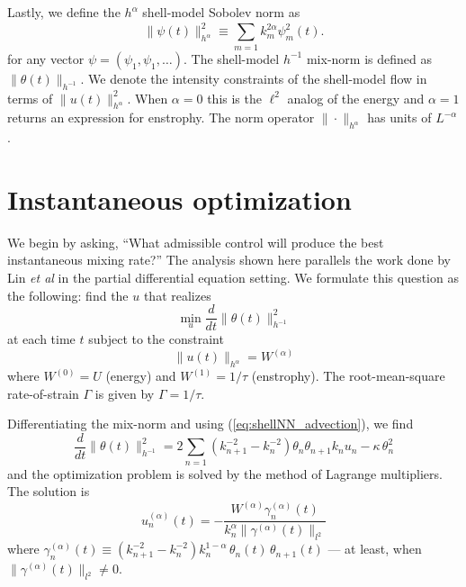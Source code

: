 Lastly, we define the $h^{\alpha}$ shell-model Sobolev norm as
\begin{equation}
	\|\psi(t)\|^2_{h^{\alpha}} \equiv \sum_{m=1}^{} k_{m}^{2\alpha}\psi^{2}_{m}(t).
\end{equation}
for any vector $\psi = (\psi_{1}, \psi_{1}, \dots)$. The shell-model $h^{-1}$ mix-norm is defined as $\| \theta (t) \|_{h^{-1}}$. We denote the intensity constraints of the shell-model flow in terms of $\| u (t) \|^{2}_{h^{\alpha}}$. When $\alpha=0$ this is the $\ell^2$ analog of the energy and $\alpha=1$ returns an expression for enstrophy. The norm operator  $\|\cdot\|_{h^{\alpha}}$ has units of $L^{-\alpha}$.

\section{Instantaneous optimization}
\label{sec:LIT}

We begin by asking, ``What admissible control will produce the best instantaneous mixing rate?'' The analysis shown here parallels the work done by Lin {\it et al} \cite{JFM2011} in the partial differential equation setting. We formulate this question as the following: find the $u$ that realizes
\begin{equation}
	\label{eq:shellNN_lit_prob}
	\min_{u}  \frac{d}{dt} \| \theta (t) \|^{2}_{h^{-1}}
\end{equation} at each time $t$ subject to the constraint
\begin{equation}
	\label{eq:shellNN_lit_contstraint}
	\| u (t) \|_{h^{\alpha}} =W^{(\alpha)}
\end{equation}
where $W^{(0)}=U$ (energy) and $W^{(1)}=1/\tau$ (enstrophy). The root-mean-square rate-of-strain $\Gamma$ is given by $\Gamma = 1/\tau$.

Differentiating the mix-norm and using (\ref{eq:shellNN_advection}), we find
\begin{equation}
	\label{eq:deriv_mix_norm}
	\frac{d}{dt} \| \theta (t) \|^{2}_{h^{-1}} = 2 \sum_{n=1}  \left(k_{n+1}^{-2}-k_{n}^{-2}\right)\theta_{n}\theta_{n+1}k_{n}u_{n} - \kappa \,  \theta_n^2
\end{equation}
and the optimization problem is solved by the method of Lagrange multipliers. The solution is
\begin{equation}
	\label{eq:LIT_optimal}
	u_{n}^{(\alpha)}(t) =-\frac{W^{(\alpha)}\gamma^{(\alpha)}_{n}(t)}{k^{\alpha}_{n}\|\gamma^{(\alpha)}(t)\|_{l^{2}}}
\end{equation}
where $ \gamma^{(\alpha)}_{n}(t) \equiv (k_{n+1}^{-2}-k_{n}^{-2})k_{n}^{1-\alpha} \, \theta_{n}(t) \, \theta_{n+1}(t)$ --- at least, when $\|\gamma^{(\alpha)}(t)\|_{l^{2}} \neq 0$.

